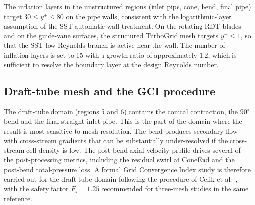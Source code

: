 The inflation layers in the unstructured regions (inlet pipe, cone, bend, final pipe) target $30 \leq y^+ \leq 80$ on the pipe walls, consistent with the logarithmic-layer assumption of the SST automatic wall treatment. On the rotating RDT blades and on the guide-vane surfaces, the structured TurboGrid mesh targets $y^+ \leq 1$, so that the SST low-Reynolds branch is active near the wall. The number of inflation layers is set to 15 with a growth ratio of approximately $1.2$, which is sufficient to resolve the boundary layer at the design Reynolds number.

\subsection{Draft-tube mesh and the GCI procedure}
\label{sec:gci_drafttube}

The draft-tube domain (regions 5 and 6) contains the conical contraction, the $90^\circ$ bend and the final straight inlet pipe. This is the part of the domain where the result is most sensitive to mesh resolution. The bend produces secondary flow with cross-stream gradients that can be substantially under-resolved if the cross-stream cell density is low. The post-bend axial-velocity profile drives several of the post-processing metrics, including the residual swirl at ConeEnd and the post-bend total-pressure loss. A formal Grid Convergence Index study is therefore carried out for the draft-tube domain following the procedure of Celik et al.~\cite{Celik2008}, with the safety factor $F_s = 1.25$ recommended for three-mesh studies in the same reference.

